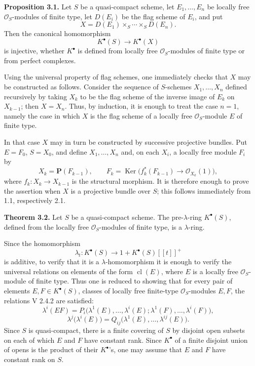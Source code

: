 \documentclass[11pt]{article}
\providecommand{\Ker}{\operatorname{Ker}}
\begin{document}
\textbf{Proposition 3.1.} Let \(S\) be a quasi-compact scheme, let \(E_1,\ldots,E_n\) be locally free \(\mathcal O_S\)-modules of finite type, let \(D(E_i)\) be the flag scheme of \(E_i\), and put
\[
  X=D(E_1)\times_S\cdots\times_S D(E_n).
\]
Then the canonical homomorphism
\[
  K^\bullet(S)\longrightarrow K^\bullet(X)
\]
is injective, whether \(K^\bullet\) is defined from locally free \(\mathcal O_S\)-modules of finite type or from perfect complexes.

Using the universal property of flag schemes, one immediately checks that \(X\) may be constructed as follows. Consider the sequence of \(S\)-schemes \(X_1,\ldots,X_n\) defined recursively by taking \(X_k\) to be the flag scheme of the inverse image of \(E_k\) on \(X_{k-1}\); then \(X=X_n\). Thus, by induction, it is enough to treat the case \(n=1\), namely the case in which \(X\) is the flag scheme of a locally free \(\mathcal O_S\)-module \(E\) of finite type.

In that case \(X\) may in turn be constructed by successive projective bundles. Put \(E=F_0\), \(S=X_0\), and define \(X_1,\ldots,X_n\) and, on each \(X_i\), a locally free module \(F_i\) by
\[
  X_k=\mathbf P(F_{k-1}),\qquad
  F_k=\Ker\bigl(f_k^*(F_{k-1})\longrightarrow\mathcal O_{X_k}(1)\bigr),
\]
where \(f_k:X_k\to X_{k-1}\) is the structural morphism. It is therefore enough to prove the assertion when \(X\) is a projective bundle over \(S\); this follows immediately from 1.1, respectively 2.1.

\textbf{Theorem 3.2.} Let \(S\) be a quasi-compact scheme. The pre-\(\lambda\)-ring \(K^\bullet(S)\), defined from the locally free \(\mathcal O_S\)-modules of finite type, is a \(\lambda\)-ring.

Since the homomorphism
\[
  \lambda_t:K^\bullet(S)\longrightarrow 1+K^\bullet(S)[[t]]^+
\]
is additive, to verify that it is a \(\lambda\)-homomorphism it is enough to verify the universal relations on elements of the form \(\operatorname{cl}(E)\), where \(E\) is a locally free \(\mathcal O_S\)-module of finite type. Thus one is reduced to showing that for every pair of elements \(E,F\in K^\bullet(S)\), classes of locally free finite-type \(\mathcal O_S\)-modules \(E,F\), the relations V 2.4.2 are satisfied:
\[
 \lambda^i(EF)
 =P_i\bigl(\lambda^1(E),\ldots,\lambda^i(E);
           \lambda^1(F),\ldots,\lambda^i(F)\bigr),
\]
\[
 \lambda^j\bigl(\lambda^i(E)\bigr)
 =Q_{ij}\bigl(\lambda^1(E),\ldots,\lambda^{ij}(E)\bigr).
\]
Since \(S\) is quasi-compact, there is a finite covering of \(S\) by disjoint open subsets on each of which \(E\) and \(F\) have constant rank. Since \(K^\bullet\) of a finite disjoint union of opens is the product of their \(K^\bullet\)'s, one may assume that \(E\) and \(F\) have constant rank on \(S\).
\end{document}
